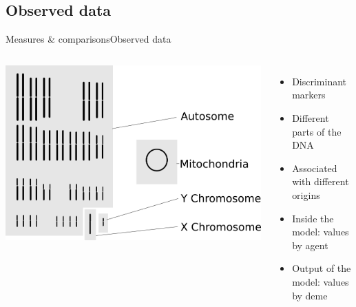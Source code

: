 \documentclass[10pt, aspectratio=43]{beamer}
\begin{document}
\subsection{Observed data}
\begin{frame}{Measures \& comparisons}{Observed data}
\begin{columns}
  \includegraphics[width=1\textwidth]{../data/markers.png}

  \begin{itemize}
    \item Discriminant markers
    \item Different parts of the DNA
    \item Associated with different origins
    \item Inside the model: values by agent
    \item Output of the model: values by deme
  \end{itemize}

\end{columns}
\end{frame}
\end{document}
